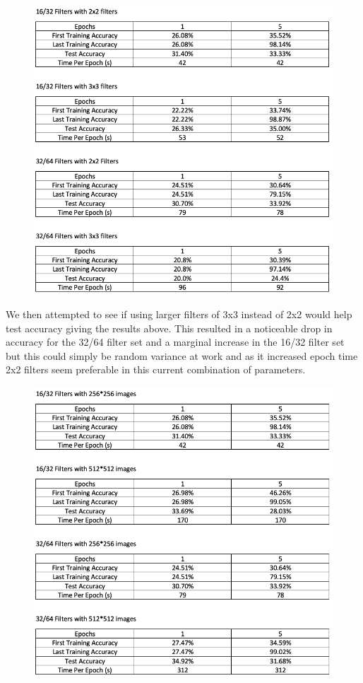 \begin{figure}[H]
\centering
\includegraphics[scale=0.6]{Media/Layers/2.png}
\end{figure}

We then attempted to see if using larger filters of 3x3 instead of 2x2 would help test accuracy giving the results above. This resulted in a noticeable drop in accuracy for the 32/64 filter set and a marginal increase in the 16/32 filter set but this could simply be random variance at work and as it increased epoch time 2x2 filters seem preferable in this current combination of parameters. \\

\begin{figure}[H]
\centering
\includegraphics[scale=0.6]{Media/Layers/3.png}
\end{figure}

